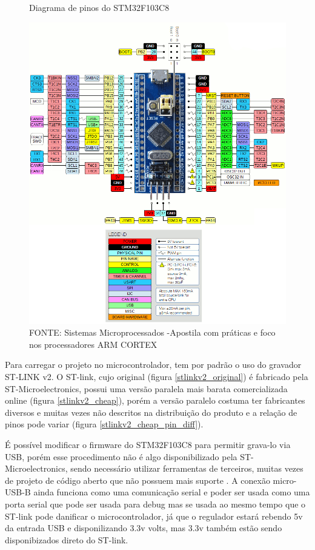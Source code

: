 \begin{figure}[ht]
	\centering
	\caption{Diagrama de pinos do STM32F103C8}
	\includegraphics[width=1.0\textwidth]{figures/stm32f1_pinout}
	\caption*{FONTE: Sistemas Microprocessados -Apostila com práticas e foco nos processadores ARM CORTEX \cite{apostila_microprossados}}
    \label{stm32f103c8_pinout}
\end{figure}

Para carregar o projeto no microcontrolador, tem por padrão o uso do gravador ST-LINK v2.
O ST-link, cujo original (figura \ref{stlinkv2_original}) é fabricado pela ST-Microelectronics, 
possui uma versão paralela mais barata
comercializada online (figura \ref{stlinkv2_cheap}), porém a versão paralelo costuma ter fabricantes diversos e 
muitas vezes não descritos na distribuição do produto 
e a relação de pinos pode variar (figura \ref{stlinkv2_cheap_pin_diff}).

É possível modificar o firmware do STM32F103C8 para permitir grava-lo via USB, porém esse procedimento
não é algo disponibilizado pela ST-Microelectronics, sendo necessário utilizar ferramentas de terceiros,
muitas vezes de projeto de código aberto que não possuem mais suporte \cite{stm32duino_bootloader}.
A conexão micro-USB-B ainda funciona como uma comunicação serial e poder ser usada como uma porta serial que pode ser usada para debug
mas se usada ao mesmo tempo que o ST-link pode danificar o microcontrolador, já que o regulador estará rebendo 5v da entrada USB
e disponilizando 3.3v volts, mas 3.3v também estão sendo disponibizados direto do ST-link.

